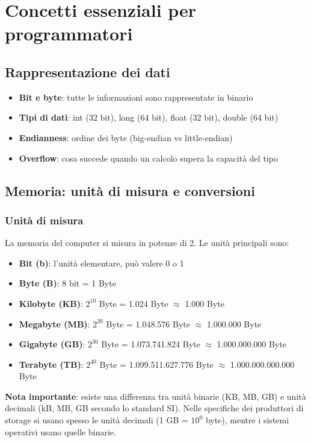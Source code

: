 \documentclass[12pt,a4paper]{article}
\begin{document}
\section{Concetti essenziali per programmatori}

\subsection{Rappresentazione dei dati}
\begin{itemize}
    \item \textbf{Bit e byte}: tutte le informazioni sono rappresentate in binario
    \item \textbf{Tipi di dati}: int (32 bit), long (64 bit), float (32 bit), double (64 bit)
    \item \textbf{\texorpdfstring{\colorbox{gray!50}{Endianness}}{}}: ordine dei byte (big-endian vs little-endian)
    \item \textbf{Overflow}: cosa succede quando un calcolo supera la capacità del tipo
\end{itemize}

\subsection{Memoria: unità di misura e conversioni}

\subsubsection{Unità di misura}
La memoria del computer si misura in potenze di 2. Le unità principali sono:

\begin{itemize}
    \item \textbf{Bit (b)}: l'unità elementare, può valere 0 o 1
    \item \textbf{Byte (B)}: 8 bit = 1 Byte
    \item \textbf{Kilobyte (KB)}: $2^{10}$ Byte = 1.024 Byte $\approx$ 1.000 Byte
    \item \textbf{Megabyte (MB)}: $2^{20}$ Byte = 1.048.576 Byte $\approx$ 1.000.000 Byte
    \item \textbf{Gigabyte (GB)}: $2^{30}$ Byte = 1.073.741.824 Byte $\approx$ 1.000.000.000 Byte
    \item \textbf{Terabyte (TB)}: $2^{40}$ Byte = 1.099.511.627.776 Byte $\approx$ 1.000.000.000.000 Byte
\end{itemize}

\textbf{Nota importante}: esiste una differenza tra unità binarie (KB, MB, GB) e unità decimali (kB, MB, GB secondo lo standard SI). Nelle specifiche dei produttori di storage si usano spesso le unità decimali (1 GB = $10^9$ byte), mentre i sistemi operativi usano quelle binarie.
\end{document}
